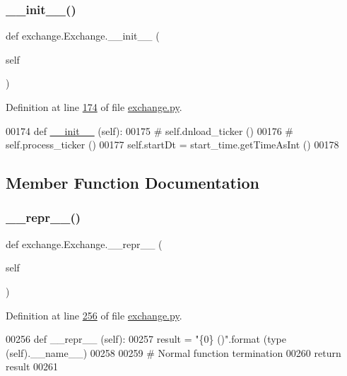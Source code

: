 \subsubsection{\texorpdfstring{\+\_\+\+\_\+init\+\_\+\+\_\+()}{\_\_init\_\_()}}
{\footnotesize\ttfamily def exchange.\+Exchange.\+\_\+\+\_\+init\+\_\+\+\_\+ (\begin{DoxyParamCaption}\item[{}]{self }\end{DoxyParamCaption})}



Definition at line \hyperlink{exchange_8py_source_l00174}{174} of file \hyperlink{exchange_8py_source}{exchange.\+py}.


\begin{DoxyCode}
00174     \textcolor{keyword}{def }\hyperlink{namespacestart__time_a9c9bd378729a13c96a22c8b079ea172c}{\_\_init\_\_} (self):
00175 \textcolor{comment}{#        self.dnload\_ticker ()}
00176 \textcolor{comment}{#        self.process\_ticker ()}
00177         self.startDt = start\_time.getTimeAsInt ()
00178     
\end{DoxyCode}


\subsection{Member Function Documentation}
\mbox{\label{classexchange_1_1_exchange_afff4d01a82947f2e3be0d4fa5e0e0fe7}} 
\subsubsection{\texorpdfstring{\+\_\+\+\_\+repr\+\_\+\+\_\+()}{\_\_repr\_\_()}}
{\footnotesize\ttfamily def exchange.\+Exchange.\+\_\+\+\_\+repr\+\_\+\+\_\+ (\begin{DoxyParamCaption}\item[{}]{self }\end{DoxyParamCaption})}



Definition at line \hyperlink{exchange_8py_source_l00256}{256} of file \hyperlink{exchange_8py_source}{exchange.\+py}.


\begin{DoxyCode}
00256     \textcolor{keyword}{def }\_\_repr\_\_ (self):
00257         result = \textcolor{stringliteral}{"\{0\} ()"}.format (type (self).\_\_name\_\_)
00258         
00259         \textcolor{comment}{# Normal function termination}
00260         \textcolor{keywordflow}{return} result
00261         
\end{DoxyCode}
\mbox{\label{classexchange_1_1_exchange_ae3fd515a25ead8667f917230b0975a98}} 
